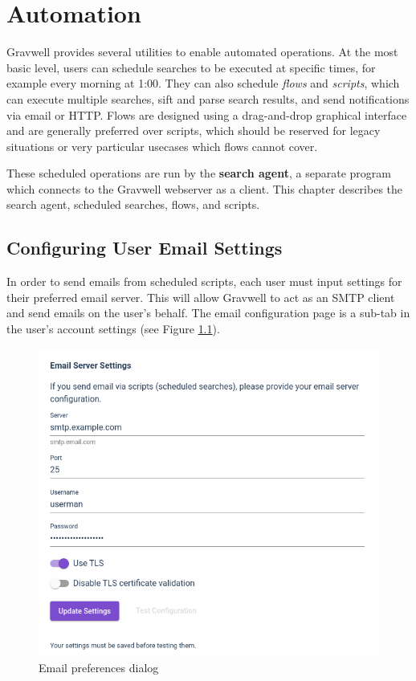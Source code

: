 \chapter{Automation}
Gravwell provides several utilities to enable automated operations.
At the most basic level, users can schedule searches to be executed at specific times, for
example every morning at 1:00. They can also schedule
\emph{flows} and \emph{scripts}, which can execute multiple searches, sift and parse search
results, and send notifications via email or HTTP. Flows are designed using a drag-and-drop
graphical interface and are generally preferred over scripts, which should be reserved for legacy
situations or very particular usecases which flows cannot cover.

These scheduled
operations are run by the \textbf{search agent}, a separate program which
connects to the Gravwell webserver as a client. This chapter describes
the search agent, scheduled searches, flows, and scripts.

\section{Configuring User Email Settings}
In order to send emails from scheduled scripts, each user must input
settings for their preferred email server. This will allow Gravwell to
act as an SMTP client and send emails on the user's behalf. The email
configuration page is a sub-tab in the user's account settings (see Figure \ref{fig:email-prefs}).

\begin{figure}
	\includegraphics[width=0.7\linewidth]{images/email-prefs.png}
	\caption{Email preferences dialog}
	\label{fig:email-prefs}
\end{figure}

